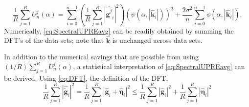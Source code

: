 \documentclass[12pt]{article}
\newcommand{\gdis}{\mathbf{g}}
\newcommand{\gnoise}{\widetilde{\mathbf{g}}}
\newcommand{\kdis}{\mathbf{k}}
\newcommand{\regparam}{\alpha}
\newcommand{\filt}{\phi}
\newcommand{\mfilt}{\psi}
\newcommand{\noiseSD}{\sigma}	%
\newcommand{\noise}{\bm{\eta}}	%
\newcommand{\U}{U}	%
\begin{document}
\begin{equation}
\frac{1}{R}\sum_{j=1}^R \U_n^j(\regparam) =  \sum_{i = 0}^{n-1} \left(\frac{1}{R}\sum_{j=1}^R |\widehat{\gnoise^j}_i|^2\right)(\mfilt(\regparam,|\widehat{\kdis}_i|))^2 + \frac{2\noiseSD^2}{n}\sum_{i = 0}^{n-1} \filt(\regparam,|\widehat{\kdis}_i|).
\label{eq:SpectralUPREavg}
\end{equation}
Numerically, \eqref{eq:SpectralUPREavg} can be readily obtained by summing the DFT's of the data sets; note that $\widehat{\kdis}$ is unchanged across data sets. \par
In addition to the numerical savings that are possible from using $(1/R)\sum_{j=1}^R \U_n^j(\regparam)$, a statistical interpretation of \eqref{eq:SpectralUPREavg} can be derived. Using \eqref{eq:DFT}, the definition of the DFT,
\[\frac{1}{R}\sum_{j=1}^R |\widehat{\gnoise}_i|^2 = \frac{1}{R}\sum_{j=1}^R |\widehat{\gdis}_i + \widehat{\noise}_i|^2 \leq \frac{1}{R}\sum_{j=1}^R |\widehat{\gdis}_i|^2  + \frac{1}{R}\sum_{j=1}^R |\widehat{\noise}_i|^2 \] 
\end{document}
